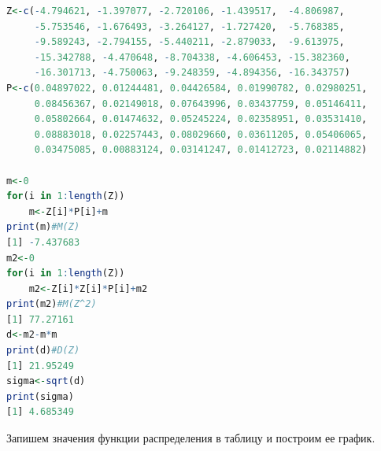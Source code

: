 \begin{lstlisting}[language=R,basicstyle=\normalsize]
Z<-c(-4.794621, -1.397077, -2.720106, -1.439517,  -4.806987,
     -5.753546, -1.676493, -3.264127, -1.727420,  -5.768385,
     -9.589243, -2.794155, -5.440211, -2.879033,  -9.613975,
     -15.342788, -4.470648, -8.704338, -4.606453, -15.382360,
     -16.301713, -4.750063, -9.248359, -4.894356, -16.343757)
P<-c(0.04897022, 0.01244481, 0.04426584, 0.01990782, 0.02980251,
     0.08456367, 0.02149018, 0.07643996, 0.03437759, 0.05146411,
     0.05802664, 0.01474632, 0.05245224, 0.02358951, 0.03531410,
     0.08883018, 0.02257443, 0.08029660, 0.03611205, 0.05406065,
     0.03475085, 0.00883124, 0.03141247, 0.01412723, 0.02114882)

m<-0
for(i in 1:length(Z))
    m<-Z[i]*P[i]+m
print(m)#M(Z)
[1] -7.437683
m2<-0
for(i in 1:length(Z))
    m2<-Z[i]*Z[i]*P[i]+m2
print(m2)#M(Z^2)
[1] 77.27161
d<-m2-m*m
print(d)#D(Z)
[1] 21.95249
sigma<-sqrt(d)
print(sigma)
[1] 4.685349
\end{lstlisting}
Запишем значения функции распределения в таблицу и построим ее график.\\ 
